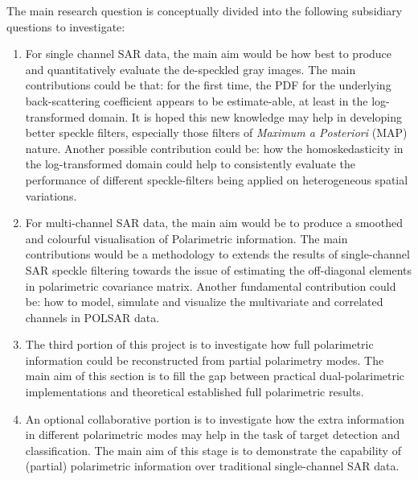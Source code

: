 The main research question is conceptually divided into the following subsidiary questions to investigate:
\begin{enumerate}
\item For single channel SAR data, the main aim would be how best to produce and quantitatively evaluate the de-speckled gray images. 
The main contributions could be that: for the first time, the PDF for the underlying back-scattering coefficient appears to be estimate-able, at least in the log-transformed domain. 
It is hoped this new knowledge may help in developing better speckle filters, especially those filters of \textit{Maximum a Posteriori} (MAP) nature.
Another possible contribution could be: how the homoskedasticity in the log-transformed domain could help to consistently evaluate the performance of different speckle-filters being applied on heterogeneous spatial variations.
\item For multi-channel SAR data, the main aim would be to produce a smoothed and colourful visualisation of Polarimetric information. 
The main contributions would be a methodology to extends the results of single-channel SAR speckle filtering towards the issue of estimating the off-diagonal elements in polarimetric covariance matrix. 
Another fundamental contribution could be: how to model, simulate and visualize the multivariate and correlated channels in POLSAR data.
\item The third portion of this project is to investigate how full polarimetric information could be reconstructed from partial polarimetry modes. 
The main aim of this section is to fill the gap between practical dual-polarimetric implementations and theoretical established full polarimetric results. 
\item An optional collaborative portion is to investigate how the extra information in different polarimetric modes may help in the task of target detection and classification. 
The main aim of this stage is to demonstrate the capability of (partial) polarimetric information over traditional single-channel SAR data.
\end{enumerate}

